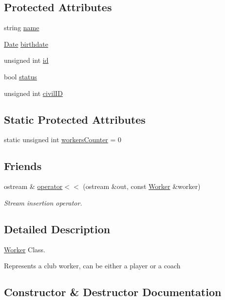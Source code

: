 \subsection*{Protected Attributes}
\begin{DoxyCompactItemize}
\item 
string \hyperlink{class_worker_a66cf57341253a31e418cf8abad59ffb1}{name}
\item 
\hyperlink{class_date}{Date} \hyperlink{class_worker_a3c1845f40a084b471750a787a87614dd}{birthdate}
\item 
unsigned int \hyperlink{class_worker_afc39287cd510977cfe7697ed2c86b2ca}{id}
\item 
bool \hyperlink{class_worker_a86618aa5fcac9253f9a7ca0dc16a31d4}{status}
\item 
unsigned int \hyperlink{class_worker_adfafba55f967994f4595bd914bbba127}{civil\+ID}
\end{DoxyCompactItemize}
\subsection*{Static Protected Attributes}
\begin{DoxyCompactItemize}
\item 
static unsigned int \hyperlink{class_worker_a5f0df787d74ab0938583c07a09d126bf}{workers\+Counter} = 0
\end{DoxyCompactItemize}
\subsection*{Friends}
\begin{DoxyCompactItemize}
\item 
ostream \& \hyperlink{class_worker_a8d1e3d13654b0c5466ec0560d2ab7c4e}{operator$<$$<$} (ostream \&out, const \hyperlink{class_worker}{Worker} \&worker)
\begin{DoxyCompactList}\small\item\em Stream insertion operator. \end{DoxyCompactList}\end{DoxyCompactItemize}


\subsection{Detailed Description}
\hyperlink{class_worker}{Worker} Class. 

Represents a club worker, can be either a player or a coach 

\subsection{Constructor \& Destructor Documentation}
\hypertarget{class_worker_a29731c51f83b66fad738b7c66383b62b}{}\label{class_worker_a29731c51f83b66fad738b7c66383b62b} 
